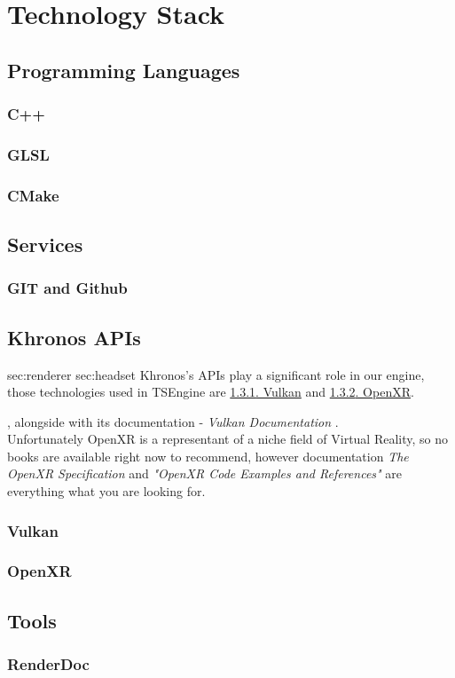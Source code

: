 \newpage
\section{Technology Stack}
\subsection{Programming Languages}
\subsubsection{C++}
\subsubsection{GLSL}
\label{sec:glsl}
\subsubsection{CMake}
\label{sec:stack_cmake}
\subsection{Services}
\subsubsection{GIT and Github}
\subsection{Khronos APIs}
\label{sec:khronos}
sec:renderer sec:headset
Khronos's APIs play a significant role in our engine, those technologies used in TSEngine are \hyperref[sec:stack_vk]{\ref*{sec:stack_vk}. Vulkan} and \hyperref[sec:stack_xr]{\ref*{sec:stack_xr}. OpenXR}. 


\cite{VulkanCookbook}, alongside with its documentation - \textit{Vulkan Documentation} \cite{VkDoc}.\\ Unfortunately OpenXR is a representant of a niche field of Virtual Reality, so no books are available right now to recommend, however documentation \textit{The OpenXR Specification} \cite{XrDoc} and \textit{"OpenXR Code Examples and References"} \cite{OpenXrExamples} are everything what you are looking for. %


\subsubsection{Vulkan}
\label{sec:stack_vk}
\subsubsection{OpenXR}
\label{sec:stack_xr}
\subsection{Tools}
\subsubsection{RenderDoc}
\label{sec:renderdoc}
